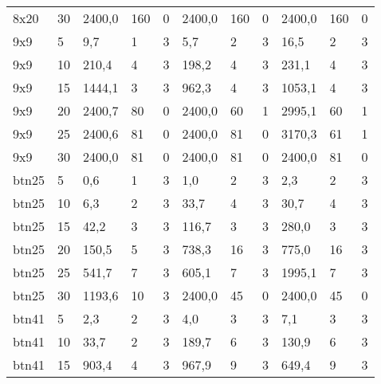 \begin{table}[]
\begin{tabular}{@{}lllllllllll@{}}
		8x20    & 30            & 2400,0    & 160       & 0      & 2400,0    & 160       & 0      & 2400,0    & 160       & 0      \\
		9x9     & 5             & 9,7       & 1         & 3      & 5,7       & 2         & 3      & 16,5      & 2         & 3      \\
		9x9     & 10            & 210,4     & 4         & 3      & 198,2     & 4         & 3      & 231,1     & 4         & 3      \\
		9x9     & 15            & 1444,1    & 3         & 3      & 962,3     & 4         & 3      & 1053,1    & 4         & 3      \\
		9x9     & 20            & 2400,7    & 80        & 0      & 2400,0    & 60        & 1      & 2995,1    & 60        & 1      \\
		9x9     & 25            & 2400,6    & 81        & 0      & 2400,0    & 81        & 0      & 3170,3    & 61        & 1      \\
		9x9     & 30            & 2400,0    & 81        & 0      & 2400,0    & 81        & 0      & 2400,0    & 81        & 0      \\
		btn25   & 5             & 0,6       & 1         & 3      & 1,0       & 2         & 3      & 2,3       & 2         & 3      \\
		btn25   & 10            & 6,3       & 2         & 3      & 33,7      & 4         & 3      & 30,7      & 4         & 3      \\
		btn25   & 15            & 42,2      & 3         & 3      & 116,7     & 3         & 3      & 280,0     & 3         & 3      \\
		btn25   & 20            & 150,5     & 5         & 3      & 738,3     & 16        & 3      & 775,0     & 16        & 3      \\
		btn25   & 25            & 541,7     & 7         & 3      & 605,1     & 7         & 3      & 1995,1    & 7         & 3      \\
		btn25   & 30            & 1193,6    & 10        & 3      & 2400,0    & 45        & 0      & 2400,0    & 45        & 0      \\
		btn41   & 5             & 2,3       & 2         & 3      & 4,0       & 3         & 3      & 7,1       & 3         & 3      \\
		btn41   & 10            & 33,7      & 2         & 3      & 189,7     & 6         & 3      & 130,9     & 6         & 3      \\
		btn41   & 15            & 903,4     & 4         & 3      & 967,9     & 9         & 3      & 649,4     & 9         & 3      \\

\end{tabular}
\end{table}
